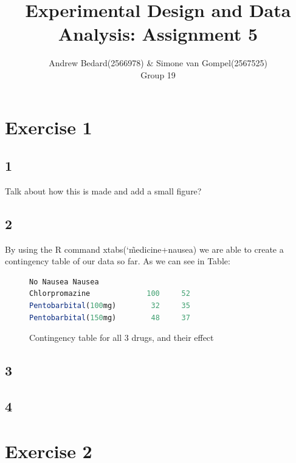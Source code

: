 \documentclass{article}
\title{Experimental Design and Data Analysis: Assignment 5}
\author{Andrew Bedard(2566978) \& Simone van Gompel(2567525) \\ Group 19}
\begin{document}
  \maketitle

  \section*{Exercise 1}
    \subsection*{1}
    Talk about how this is made and add a small figure?
    \subsection*{2}
    By using the R command xtabs(\char`\~ medicine+nausea) we are able to create a contingency table of our data so far. As we can see in Table:
    \begin{figure}
    \begin{lstlisting}[language=R]
                     No Nausea Nausea
Chlorpromazine             100     52
Pentobarbital(100mg)        32     35
Pentobarbital(150mg)        48     37
    \end{lstlisting}
    \caption{Contingency table for all 3 drugs, and their effect}
    \end{figure}
    \subsection*{3}
    
    \subsection*{4}
    
  \section*{Exercise 2}
\end{document}
